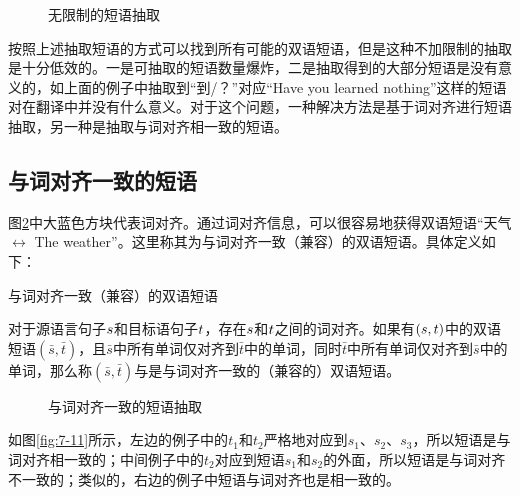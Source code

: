 \begin{figure}[htp]
\centering

\caption{无限制的短语抽取}
\label{fig:7-9}
\end{figure}

\parinterval 按照上述抽取短语的方式可以找到所有可能的双语短语，但是这种不加限制的抽取是十分低效的。一是可抽取的短语数量爆炸，二是抽取得到的大部分短语是没有意义的，如上面的例子中抽取到“到/？”对应“Have you learned nothing”这样的短语对在翻译中并没有什么意义。对于这个问题，一种解决方法是基于词对齐进行短语抽取，另一种是抽取与词对齐相一致的短语。


\subsection{与词对齐一致的短语}

\parinterval 图\ref{fig:7-10}中大蓝色方块代表词对齐。通过词对齐信息，可以很容易地获得双语短语“天气 $\leftrightarrow$ The weather”。这里称其为与词对齐一致（兼容）的双语短语。具体定义如下：

\vspace{0.5em}
\begin{definition} 与词对齐一致（兼容）的双语短语

{\small
对于源语言句子${s}$和目标语句子${t}$，存在${s}$和${t}$之间的词对齐。如果有$({s},{t})$中的双语短语$(\bar{s},\bar{t})$，且$\bar{s}$中所有单词仅对齐到$\bar{t}$中的单词，同时$\bar{t}$中所有单词仅对齐到$\bar{s}$中的单词，那么称$(\bar{s},\bar{t})$与是与词对齐一致的（兼容的）双语短语。
}
\end{definition}

\begin{figure}[htp]
\centering

\caption{与词对齐一致的短语抽取}
\label{fig:7-10}
\end{figure}

\parinterval 如图\ref{fig:7-11}所示，左边的例子中的$t_1$和$t_2$严格地对应到$s_1$、$s_2$、$s_3$，所以短语是与词对齐相一致的；中间例子中的$t_2$对应到短语$s_1$和$s_2$的外面，所以短语是与词对齐不一致的；类似的，右边的例子中短语与词对齐也是相一致的。

